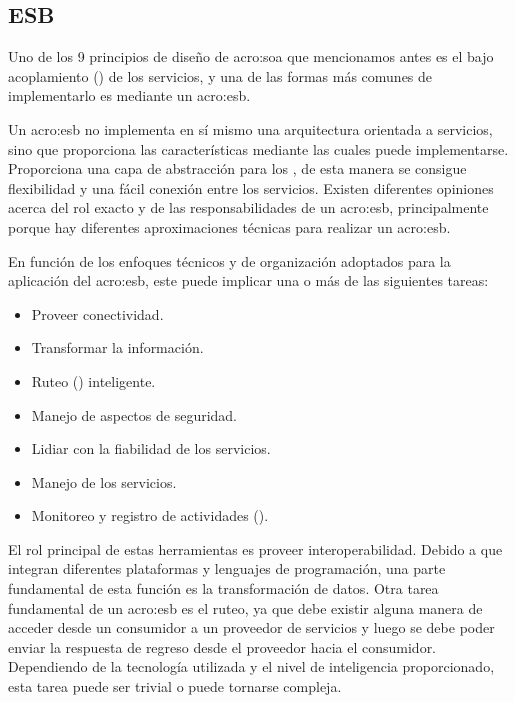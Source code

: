 
\subsection{ESB}
\label{esb:introduccion}


Uno de los 9 principios de diseño de \gls{acro:soa} que mencionamos antes es el bajo acoplamiento () de los servicios, y una de las formas más comunes de implementarlo es mediante un \gls{acro:esb}.

Un \gls{acro:esb} no implementa en sí mismo una arquitectura orientada a servicios, sino que proporciona las características mediante las cuales puede implementarse. Proporciona una capa de abstracción para los , de esta manera se consigue flexibilidad y una fácil conexión entre los servicios. Existen diferentes opiniones acerca del rol exacto y de las responsabilidades de un \gls{acro:esb}, principalmente porque hay diferentes aproximaciones técnicas para realizar un \gls{acro:esb}\cite[p.~47]{josuttis2007}.

En función de los enfoques técnicos y de organización adoptados para la aplicación del \gls{acro:esb}, este puede implicar una o más de las siguientes tareas:

\begin{itemize}
  \item Proveer conectividad.
  \item Transformar la información.
  \item Ruteo () inteligente.
  \item Manejo de aspectos de seguridad.
  \item Lidiar con la fiabilidad de los servicios.
  \item Manejo de los servicios.
  \item Monitoreo y registro de actividades ().
\end{itemize}

El rol principal de estas herramientas es proveer interoperabilidad. Debido a que integran diferentes plataformas y lenguajes de programación, una parte fundamental de esta función es la transformación de datos.
Otra tarea fundamental de un \gls{acro:esb} es el ruteo, ya que debe existir alguna manera de acceder desde un consumidor a un proveedor de servicios y luego se debe poder enviar la respuesta de regreso desde el proveedor hacia el consumidor. Dependiendo de la tecnología utilizada y el nivel de inteligencia proporcionado, esta tarea puede ser trivial o puede tornarse compleja.

